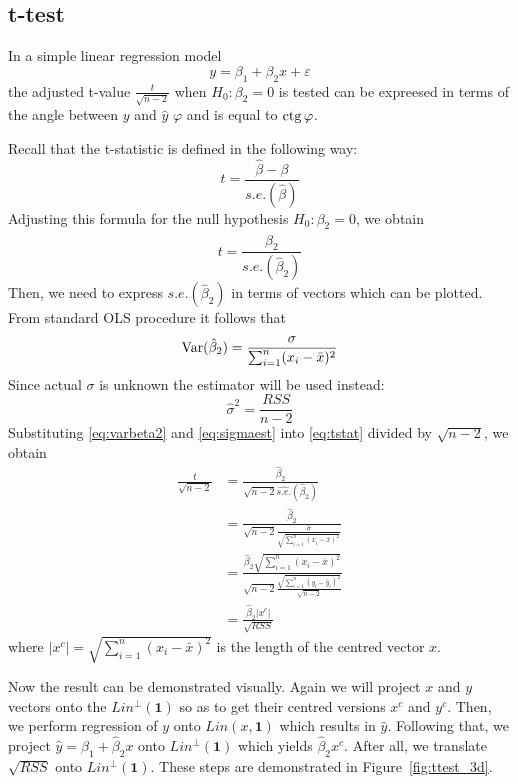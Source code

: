 \subsection{t-test}

In a simple linear regression model
\[
y = \beta_1 + \beta_2 x + \varepsilon
\]
the adjusted t-value $\frac{t}{\sqrt{n-2}}$ when $H_0: \beta_2 = 0$ is tested
can be expreesed in terms of the angle between $y$ and $\hat y$ $\varphi$ and
is equal to $\operatorname{ctg} \varphi$.

Recall that the t-statistic is defined in the following way:
\[
t = \frac{\hat \beta - \beta}{s.e.(\hat\beta)}
\]
Adjusting this formula for the null hypothesis $H_0: \beta_2 = 0$, we obtain
\begin{equation}\label{eq:tstat}
t = \frac{\hat \beta_2}{s.e.(\hat\beta_2)}
\end{equation}
Then, we need to express $s.e.(\hat\beta_2)$ in terms of vectors which can be
plotted. From standard OLS procedure it follows that
\begin{equation}\label{eq:varbeta2}
\operatorname{Var}(\hat \beta_2) = \frac{\sigma}{\sum_{i=1}^n (x_i - \bar x)^2}
\end{equation}
Since actual $\sigma$ is unknown the estimator will be used instead:
\begin{equation}\label{eq:sigmaest}
\hat \sigma^2 = \frac{RSS}{n-2}
\end{equation}
Substituting \eqref{eq:varbeta2} and \eqref{eq:sigmaest} into \eqref{eq:tstat}
divided by $\sqrt{n-2}$, we obtain
\begin{align*}
\frac{t}{\sqrt{n-2}} &= \frac{\hat \beta_2}{\sqrt{n-2}\widehat{s.e.}(\hat\beta_2)} \\
&= \frac{\hat \beta_2}{\sqrt{n-2}\frac{\hat \sigma}{\sqrt{\sum_{i=1}^n (x_i - \bar x)^2}}} \\
&= \frac{\hat \beta_2 \sqrt{\sum_{i=1}^n (x_i - \bar x)^2}}{\sqrt{n-2}\frac{\sqrt{\sum_{i=1}^n (y_i - \hat y_i)^2}}{\sqrt{n-2}}} \\
&= \frac{\hat \beta_2 \vert x^c \vert}{\sqrt{RSS}}
\end{align*}
where $ \vert x^c \vert = \sqrt{\sum_{i=1}^n (x_i - \bar x)^2}$ is the length of the
centred vector $x$.

Now the result can be demonstrated visually.
Again we will project $x$ and $y$ vectors onto the $Lin^{\perp}(\mathbf{1})$ so as to
get their centred versions $x^c$ and $y^c$.
Then, we perform regression of $y$ onto $Lin(x, \mathbf{1})$ which results in $\hat y$.
Following that, we project $\hat y = \hat \beta_1 + \hat \beta_2 x$ onto $Lin^{\perp}(\mathbf{1})$
which yields $\hat \beta_2 x^c$.
After all, we translate $\sqrt{RSS}$ onto $Lin^{\perp}(\mathbf{1})$.
These steps are demonstrated in Figure~\ref{fig:ttest_3d}.

